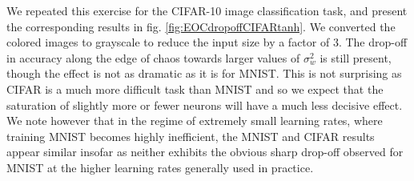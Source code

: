 We repeated this exercise for the CIFAR-10 image classification task, and present the corresponding results in fig. \ref{fig:EOCdropoffCIFARtanh}. We converted the colored images to grayscale to reduce the input size by a factor of 3. The drop-off in accuracy along the edge of chaos towards larger values of $\sigma_{w}^{2}$ is still present, though the effect is not as dramatic as it is for MNIST. This is not surprising as CIFAR is a much more difficult task than MNIST and so we expect that the saturation of slightly more or fewer neurons will have a much less decisive effect. We note however that in the regime of extremely small learning rates, where training MNIST becomes highly inefficient, the MNIST and CIFAR results appear similar insofar as neither exhibits the obvious sharp drop-off observed for MNIST at the higher learning rates generally used in practice.

